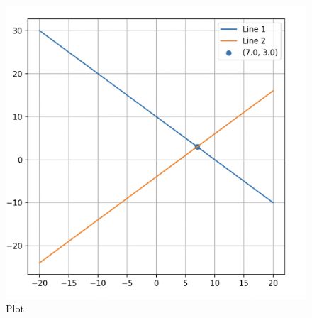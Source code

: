 \documentclass[12pt]{article}
\begin{document}
\begin{figure}[H]
    \centering
    \includegraphics[width=0.6\columnwidth]{Figs/582.png}
    \caption{Plot}
    \label{fig:placeholder}
\end{figure}
\end{document}
